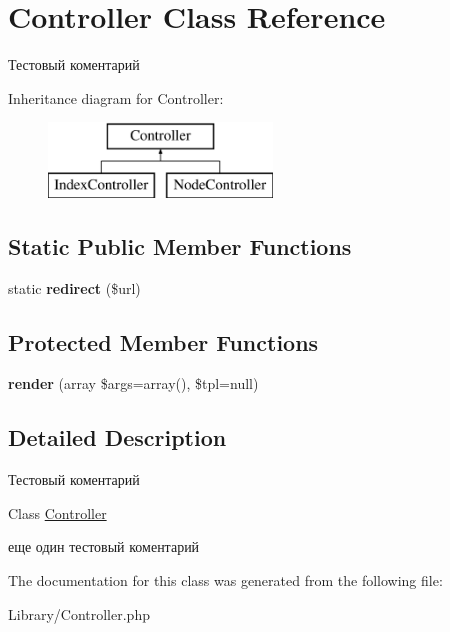 \hypertarget{class_controller}{\section{Controller Class Reference}
\label{class_controller}
}


Тестовый коментарий  


Inheritance diagram for Controller\-:\begin{figure}[H]
\begin{center}
\leavevmode
\includegraphics[height=2.000000cm]{class_controller}
\end{center}
\end{figure}
\subsection*{Static Public Member Functions}
\begin{DoxyCompactItemize}
\item 
\hypertarget{class_controller_a4c9227317bc5a987371b5eb4407f75e1}{static {\bfseries redirect} (\$url)}\label{class_controller_a4c9227317bc5a987371b5eb4407f75e1}

\end{DoxyCompactItemize}
\subsection*{Protected Member Functions}
\begin{DoxyCompactItemize}
\item 
\hypertarget{class_controller_a87cbafbc85f49bc8864557e1ffe0c143}{{\bfseries render} (array \$args=array(), \$tpl=null)}\label{class_controller_a87cbafbc85f49bc8864557e1ffe0c143}

\end{DoxyCompactItemize}


\subsection{Detailed Description}
Тестовый коментарий 

Class \hyperlink{class_controller}{Controller}

еще один тестовый коментарий 

The documentation for this class was generated from the following file\-:\begin{DoxyCompactItemize}
\item 
Library/Controller.\-php\end{DoxyCompactItemize}
